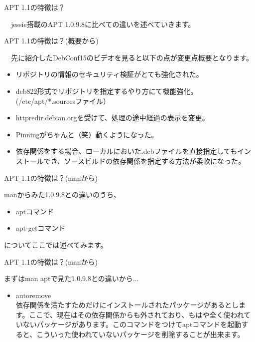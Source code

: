 \begin{frame}{APT 1.1の特徴は？}

　jessie搭載のAPT 1.0.9.8に比べての違いを述べていきます。

\end{frame}

\begin{frame}{APT 1.1の特徴は？(概要から)}

　先に紹介したDebConf15のビデオを見ると以下の点が変更点概要となります。

\begin{itemize}
\item リポジトリの情報のセキュリティ検証がとても強化された。
\item deb822形式でリポジトリを指定するやり方にて機能強化。(/etc/apt/*.sourcesファイル）
\item httpredir.debian.orgを受けて、処理の途中経過の表示を変更。
\item Pinningがちゃんと（笑）動くようになった。
\item 依存関係をする場合、ローカルにおいた.debファイルを直接指定してもインストールでき、ソースビルドの依存関係を指定する方法が柔軟になった。
\end{itemize}

\end{frame}  

\begin{frame}{APT 1.1の特徴は？(manから)}

  manからみた1.0.9.8との違いのうち、
  \begin{itemize}
  \item aptコマンド
  \item apt-getコマンド
  \end{itemize}
  についてここでは述べてみます。
\end{frame}

\begin{frame}{APT 1.1の特徴は？(manから)}

  まずはman aptで見た1.0.9.8との違いから...

 \begin{itemize}
 \item autoremove \\
   依存関係を満たすためだけにインストールされたパッケージがあるとします。ここで、現在はその依存関係からも外されており、もはや全く使われていないパッケージがあります。このコマンドをつけてaptコマンドを起動すると、こういった使われていないパッケージを削除することが出来ます。
 \end{itemize}
\end{frame}

